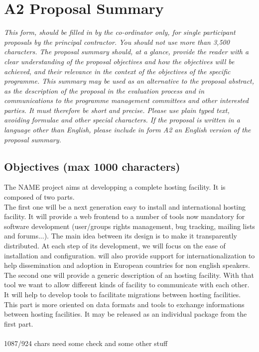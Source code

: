 \documentclass[a4paper,11pt]{report}
\begin{document}
\section*{A2 Proposal Summary}
\textit{This form, should be filled in by the co-ordinator only, for single
participant proposals by the principal contractor. You should not use more than
3,500 characters. The proposal summary should, at a glance, provide the reader
with a clear understanding of the proposal objectives and how the objectives
will be achieved, and their relevance in the context of the objectives of the
specific programme. This summary may be used as an alternative to the proposal
abstract, as the description of the proposal in the evaluation process and in
communications to the programme management committees and other interested
parties. It must therefore be short and precise. Please use plain typed text,
avoiding formulae and other special characters. If the proposal is written in a
language other than English, please include in form A2 an English version of
the proposal summary.} \\
\subsection*{Objectives (max 1000 characters)}
The NAME project aims at developping a complete hosting facility. It is 
composed of two parts. \\
The first one will be a next generation easy to install and international
hosting facility. It will provide a web frontend to a number of tools now 
mandatory for software development (user/groups rights management, bug tracking, mailing lists and forums...). 
The main idea between its design is to make it transparently distributed.
At each step of its development, we will focus on the ease of installation and configuration.  will also provide support for internationalization to help dissemination and adoption in European countries for non english speakers.\\
The second one will provide a generic description of
an hosting facility. With that tool we want to allow different kinds of facility
to communicate with each other. It will help to develop tools to facilitate
migrations between hosting facilities. This part is more oriented on data formats and tools to exchange informations between hosting facilities. It may
be released as an individual package from the first part.\\
\\ 1087/924 chars need some check and some other stuff
\end{document}
